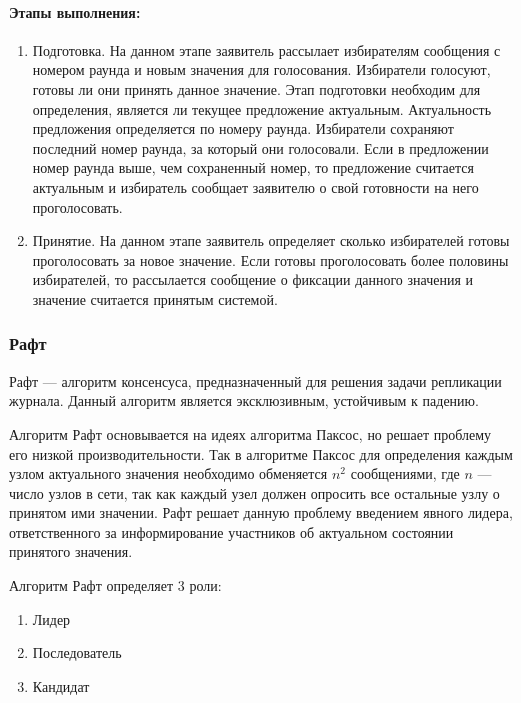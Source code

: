                 \paragraph{Этапы выполнения:}
                
                    \begin{enumerate}
                        \item Подготовка. На данном этапе заявитель рассылает избирателям сообщения с номером раунда и новым значения для голосования. Избиратели голосуют, готовы ли они принять данное значение. Этап подготовки необходим для определения, является ли текущее предложение актуальным. Актуальность предложения определяется по номеру раунда. Избиратели сохраняют последний номер раунда, за который они голосовали. Если в предложении номер раунда выше, чем сохраненный номер, то предложение считается актуальным и избиратель сообщает заявителю о свой готовности на него проголосовать.
                        \item Принятие. На данном этапе заявитель определяет сколько избирателей готовы проголосовать за новое значение. Если готовы проголосовать более половины избирателей, то рассылается сообщение о фиксации данного значения и значение считается принятым системой.
                    \end{enumerate}
                
            \subsubsection{Рафт}
            
                Рафт\cite{ongaro2014search} --- алгоритм консенсуса, предназначенный для решения задачи репликации журнала. Данный алгоритм является эксклюзивным, устойчивым к падению.
                
                Алгоритм Рафт основывается на идеях алгоритма Паксос, но решает проблему его низкой производительности. Так в алгоритме Паксос для определения каждым узлом актуального значения необходимо обменяется \( n^2 \) сообщениями, где \( n \) --- число узлов в сети, так как каждый узел должен опросить все остальные узлу о принятом ими значении. Рафт решает данную проблему введением явного лидера, ответственного за информирование участников об актуальном состоянии принятого значения.
                
                Алгоритм Рафт определяет 3 роли:
                
                \begin{enumerate}
                    \item Лидер
                    \item Последователь
                    \item Кандидат
                \end{enumerate}
                
